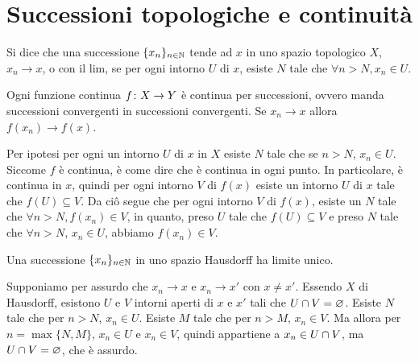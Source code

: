 \documentclass[a4paper]{article}
\begin{document}
\section{Successioni topologiche e continuità}

\begin{snippetdefinition}{}
    Si dice che una successione \(\{x_n\}_{n\in\mathbb{N}}\)
    tende ad \(x\) in uno spazio topologico \(X\), \(x_n \to x\),
    o con il lim, se per ogni intorno \(U\) di \(x\),
    esiste \(N\) tale che \(\forall n > N, x_n \in U\).
\end{snippetdefinition}

\begin{snippetproposition}{}
    Ogni funzione continua \(f \colon X \to Y\) è continua per successioni, ovvero manda
    successioni convergenti in successioni convergenti.
    Se \(x_n \to x\) allora \(f(x_n) \to f(x)\).
\end{snippetproposition}

\begin{snippetproof}{}
    Per ipotesi per ogni un intorno \(U\) di \(x\) in \(X\)
    esiste \(N\) tale che se \(n > N\), \(x_n \in U\).
    Siccome \(f\) è continua, è come dire che è continua in ogni punto.
    In particolare, è continua in \(x\), quindi per ogni intorno \(V\)
    di \(f(x)\) esiste un intorno \(U\) di \(x\) tale che \(f(U) \subseteq V\).
    Da ciô segue che per ogni intorno \(V\) di \(f(x)\), esiste un
    \(N\) tale che \(\forall n > N, f(x_n) \in V\), in quanto, preso \(U\)
    tale che \(f(U) \subseteq V\) e preso \(N\) tale che \(\forall n > N\),
    \(x_n \in U\), abbiamo \(f(x_n) \in V\).
\end{snippetproof}

\begin{snippetproposition}{}
    Una successione \(\{x_n\}_{n\in\mathbb{N}}\) in uno spazio Hausdorff ha limite unico.
\end{snippetproposition}

\begin{snippetproof}{}
    Supponiamo per assurdo che \(x_n \to x\) e \(x_n \to x'\) con \(x \neq x'\).
    Essendo \(X\) di Hausdorff, esistono \(U\) e \(V\) intorni
    aperti di \(x\) e \(x'\) tali che \(U \cap V = \varnothing\).
    Esiste \(N\) tale che per \(n > N\), \(x_n \in U\).
    Esiste \(M\) tale che per \(n > M\), \(x_n \in V\).
    Ma allora per \(n = \max\{N, M\}\), \(x_n \in U\) e \(x_n \in V\),
    quindi appartiene a \(x_n \in U \cap V\), ma \(U \cap V = \varnothing\), che è assurdo.
\end{snippetproof}
\end{document}

